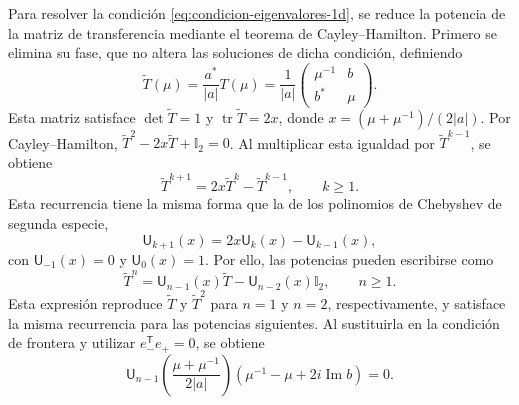 \documentclass[12pt,a4paper,oneside]{report} %
\begin{document}
Para resolver la condición \eqref{eq:condicion-eigenvalores-1d}, se reduce la potencia de la matriz de transferencia mediante el teorema de Cayley--Hamilton. Primero se elimina su fase, que no altera las soluciones de dicha condición, definiendo
\begin{equation}
  \widetilde T(\mu)
  =\frac{a^*}{|a|}T(\mu)
  =\frac1{|a|}
  \begin{pmatrix}
    \mu^{-1}&b\\
    b^*&\mu
  \end{pmatrix}.
\end{equation}
Esta matriz satisface $\det\widetilde T=1$ y $\operatorname{tr}\widetilde T=2x$, donde $x=(\mu+\mu^{-1})/(2|a|)$. Por Cayley--Hamilton, $\widetilde T^2-2x\widetilde T+\mathbb I_2=0$. Al multiplicar esta igualdad por $\widetilde T^{k-1}$, se obtiene
\begin{equation}
  \widetilde T^{k+1}
  =2x\widetilde T^k-\widetilde T^{k-1},
  \qquad k\geq1.
\end{equation}
Esta recurrencia tiene la misma forma que la de los polinomios de Chebyshev de segunda especie,
\begin{equation}
  \mathsf U_{k+1}(x)
  =2x\mathsf U_k(x)-\mathsf U_{k-1}(x),
\end{equation}
con $\mathsf U_{-1}(x)=0$ y $\mathsf U_0(x)=1$. Por ello, las potencias pueden escribirse como
\begin{equation}
  \widetilde T^n
  =\mathsf U_{n-1}(x)\widetilde T
  -\mathsf U_{n-2}(x)\mathbb I_2,
  \qquad n\geq1.
  \label{eq:potencias-transferencia-chebyshev}
\end{equation}
Esta expresión reproduce $\widetilde T$ y $\widetilde T^2$ para $n=1$ y $n=2$, respectivamente, y satisface la misma recurrencia para las potencias siguientes. Al sustituirla en la condición de frontera y utilizar $e_-^{\mathsf T}e_+=0$, se obtiene
\begin{equation}
  \mathsf U_{n-1}\!\left(
    \frac{\mu+\mu^{-1}}{2|a|}
  \right)
  \left(\mu^{-1}-\mu+2i\operatorname{Im}b\right)=0.
  \label{eq:condicion-factorizada-1d}
\end{equation}
\end{document}
